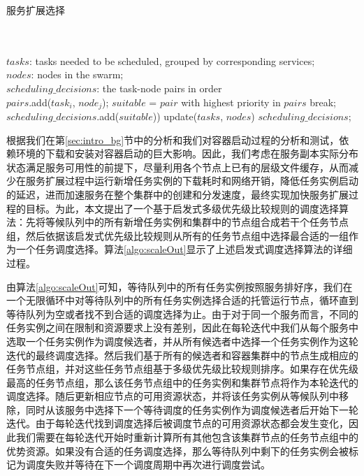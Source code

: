 \begin{algorithm}[H]
\caption{服务扩展选择}
\label{algo:scaleOut}
\begin{algorithmic}[0]
\\
\Require ~~\
\\
$tasks$: tasks needed to be scheduled, grouped by corresponding services;\\
$nodes$: nodes in the swarm;
\Ensure ~~\
\\
$scheduling\_decisions$: the task-node pairs in order \\

                \State $pairs$.add($task_{i}$, $node_{j}$);
            \EndIf
        \EndFor
    \EndFor
    \State $suitable$ = ${pair}$ with highest priority in ${pairs}$
        \State break;
    \EndIf
    \State $scheduling\_decisions$.add($suitable$))  
    \State update($tasks$, $nodes$)
\EndWhile
\State \Return $scheduling\_decisions$;
\end{algorithmic}
\end{algorithm}

根据我们在第\ref{sec:intro_bg}节中的分析和我们对容器启动过程的分析和测试，依赖环境的下载和安装对容器启动的巨大影响。因此，我们考虑在服务副本实际分布状态满足服务可用性的前提下，尽量利用各个节点上已有的层级文件缓存，从而减少在服务扩展过程中运行新增任务实例的下载耗时和网络开销，降低任务实例启动的延迟，进而加速服务在整个集群中的创建和分发速度，最终实现加快服务扩展过程的目标。为此，本文提出了一个基于启发式多级优先级比较规则的调度选择算法：先将等候队列中的所有新增任务实例和集群中的节点组合成若干个任务节点组，然后依据该启发式优先级比较规则从所有的任务节点组中选择最合适的一组作为一个任务调度选择。算法\ref{algo:scaleOut}显示了上述启发式调度选择算法的详细过程。

由算法\ref{algo:scaleOut}可知，等待队列中的所有任务实例按照服务排好序，我们在一个无限循环中对等待队列中的所有任务实例选择合适的托管运行节点，循环直到等待队列为空或者找不到合适的调度选择为止。由于对于同一个服务而言，不同的任务实例之间在限制和资源要求上没有差别，因此在每轮迭代中我们从每个服务中选取一个任务实例作为调度候选者，并从所有候选者中选择一个任务实例作为这轮迭代的最终调度选择。然后我们基于所有的候选者和容器集群中的节点生成相应的任务节点组，并对这些任务节点组基于多级优先级比较规则排序。如果存在优先级最高的任务节点组，那么该任务节点组中的任务实例和集群节点将作为本轮迭代的调度选择。随后更新相应节点的可用资源状态，并将该任务实例从等候队列中移除，同时从该服务中选择下一个等待调度的任务实例作为调度候选者后开始下一轮迭代。由于每轮迭代找到调度选择后被调度节点的可用资源状态都会发生变化，因此我们需要在每轮迭代开始时重新计算所有其他包含该集群节点的任务节点组中的优势资源。如果没有合适的任务调度选择，那么等待队列中剩下的任务实例会被标记为调度失败并等待在下一个调度周期中再次进行调度尝试。

